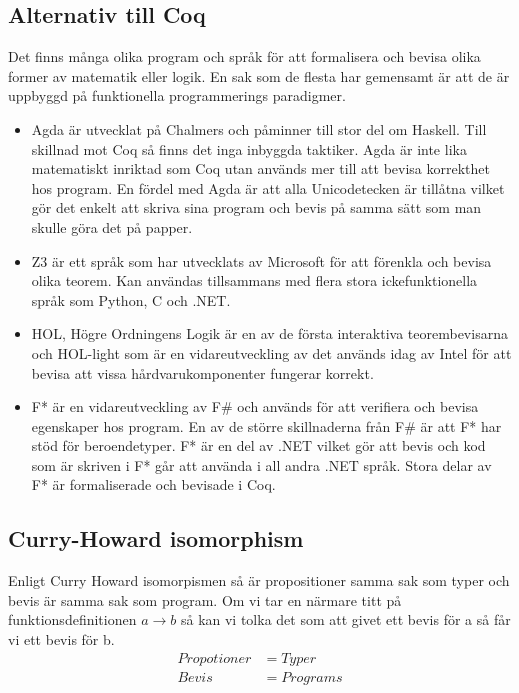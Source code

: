 \subsection{Alternativ till Coq}
Det finns många olika program och språk för att formalisera och bevisa olika
former av matematik eller logik. En sak som de flesta har gemensamt är att de
är uppbyggd på funktionella programmerings paradigmer.

\begin{itemize}
\item Agda är utvecklat på Chalmers och påminner till stor del om Haskell. Till
skillnad mot Coq så finns det inga inbyggda taktiker.  Agda är inte lika
matematiskt inriktad som Coq utan används mer till att bevisa korrekthet hos
program. En fördel med Agda är att alla Unicodetecken är tillåtna vilket gör
det enkelt att skriva sina program och bevis på samma sätt som man skulle göra
det på papper.

\item Z3 är ett språk som har utvecklats av Microsoft för att förenkla och bevisa
olika teorem. Kan användas tillsammans med flera stora ickefunktionella språk
som Python, C och .NET.

\item HOL, Högre Ordningens Logik är en av de första interaktiva teorembevisarna och
HOL-light som är en vidareutveckling av det används idag av Intel för att
bevisa att vissa hårdvarukomponenter fungerar korrekt.

\item F* är en vidareutveckling av F\# och används för att verifiera och bevisa
egenskaper hos program. En av de större skillnaderna från F\# är att F* har
stöd för beroendetyper. F* är en del av .NET vilket gör att bevis och kod som
är skriven i F* går att använda i all andra .NET språk. Stora delar av F* är
formaliserade och bevisade i Coq.
\end{itemize}

\begin{comment}
Källor och annat material
HOL http://www.cl.cam.ac.uk/~jrh13/hol-light/
Z3 http://research.microsoft.com/en-us/um/redmond/projects/z3/old/
F* http://research.microsoft.com/en-us/projects/fstar/
\end{comment}

\subsection{Curry-Howard isomorphism}
Enligt Curry Howard isomorpismen så är propositioner samma sak som typer och
bevis är samma sak som program. Om vi tar en närmare titt på
funktionsdefinitionen $a \rightarrow b$ så kan vi tolka det som att givet ett
bevis för a så får vi ett bevis för b.
\begin{align*}
  Propotioner &= Typer \\
  Bevis       &= Programs
\end{align*}

